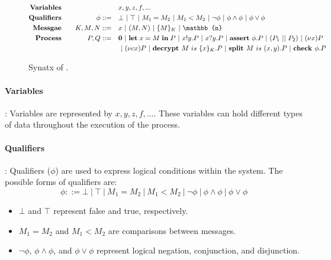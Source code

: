 \documentclass[master,english]{kuisthesis}
\theoremstyle{definition}
\begin{document}
\begin{figure}[h!]
\centering
{\small
    \begin{alignat*}{2}
    \text{\textbf{Variables}}& \quad &\quad& x, y, z, f, ...
    \\\text{\textbf{Qualifiers}} & \quad & \phi ::= \quad & \bot ~|~ \top ~|~ M_1 = M_2 ~|~ M_1 < M_2 ~|~  \neg \phi ~|~ \phi \land \phi ~|~ \phi \lor \phi
    \\\text{\textbf{Messgae}} & \quad & K, M, N ::= \quad &  x ~|~ (M, N) ~|~ \{M\}_K ~|~ \mathbb{n}
    \\\text{\textbf{Process}} & \quad & P, Q ::= \quad & \mathbf{0} ~|~ \letP{x}{M}{P} ~|~ x!y.P ~|~ x?y.P  ~|~ \assertP{\phi}.P ~|~(P_1 ~||~ P_2) ~|~ \newP{x}P \\
   &\quad&\quad& ~|~ \newP{cx}P ~|~ \decryptP{M}{x}{K}.P ~|~ \splitP{M}{x}{y}.P 
    ~|~ \checkP{\phi}.P
  \end{alignat*}
}
    \caption{Synatx of \langname{}.}
    \label{fig:synatx}
\end{figure}



\paragraph{Variables}:
Variables are represented by \( x, y, z, f, \ldots \). These variables can hold different types of data throughout the execution of the process.

\paragraph{Qualifiers}:
Qualifiers (\(\phi\)) are used to express logical conditions within the system. The possible forms of qualifiers are:
\[
\phi ::= \bot ~|~ \top ~|~ M_1 = M_2 ~|~ M_1 < M_2 ~|~ \neg \phi ~|~ \phi \land \phi ~|~ \phi \lor \phi
\]
\begin{itemize}
    \item \(\bot\) and \(\top\) represent false and true, respectively.
    \item \(M_1 = M_2\) and \(M_1 < M_2\) are comparisons between messages.
    \item \(\neg \phi\), \(\phi \land \phi\), and \(\phi \lor \phi\) represent logical negation, conjunction, and disjunction.
\end{itemize}
\end{document}
